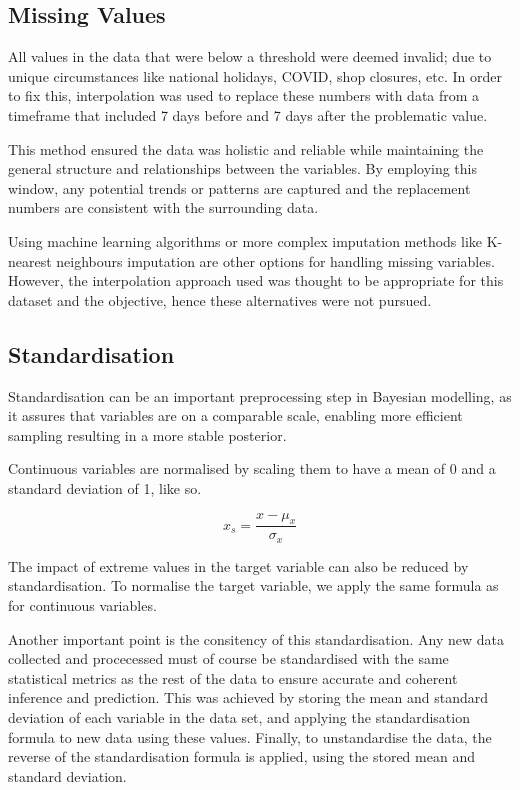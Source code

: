 \subsection{Missing Values}

All values in the data that were below a threshold were deemed invalid; due to
unique circumstances like national holidays, COVID, shop closures, etc. In
order to fix this, interpolation was used to replace these numbers with data
from a timeframe that included 7 days before and 7 days after the problematic
value.

This method ensured the data was holistic and reliable while maintaining the
general structure and relationships between the variables. By employing this
window, any potential trends or patterns are captured and the replacement
numbers are consistent with the surrounding data.

Using machine learning algorithms or more complex imputation methods like
K-nearest neighbours imputation are other options for handling missing
variables. However, the interpolation approach used was thought to be
appropriate for this dataset and the objective, hence these alternatives were
not pursued.


\subsection{Standardisation}

Standardisation can be an important preprocessing step in Bayesian modelling,
as it assures that variables are on a comparable scale, enabling more efficient
sampling resulting in a more stable posterior. \cite{gelman2013philosophy}

Continuous variables are normalised by scaling them to have a mean of 0 and a
standard deviation of 1, like so.

\begin{equation}
  x_{s} = \frac{x - \mu_x}{\sigma_x}
\end{equation}

The impact of extreme values in the target variable can also be reduced by
standardisation. To normalise the target variable, we apply the same formula as
for continuous variables.

Another important point is the consitency of this standardisation. Any new data
collected and procecessed must of course be standardised with the same
statistical metrics as the rest of the data to ensure accurate and coherent
inference and prediction. This was achieved by storing the mean and standard 
deviation of each variable in the data set, and applying the standardisation 
formula to new data using these values. Finally, to unstandardise the data, the 
reverse of the standardisation formula is applied, using the stored mean and
standard deviation. 

